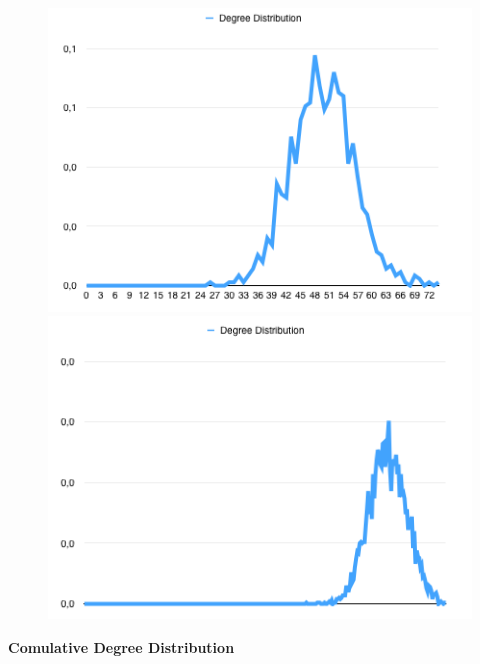 \documentclass[a4paper,titlepage,11pt]{article}
\begin{document}
\begin{figure}[h]
    \centering
    \includegraphics[scale=0.50]{img/dd-1000-05.png}
    \includegraphics[scale=0.50]{img/dd-5000-05.png}
\end{figure}


\textbf{Comulative Degree Distribution}
\end{document}
